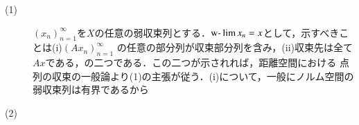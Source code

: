 	\begin{prf}
		\begin{description}
			\item[(1)] $(x_n)_{n=1}^{\infty}$を$X$の任意の弱収束列とする．$\mbox{w-}\lim x_n = x$として，示すべきことは(i)$(Ax_n)_{n=1}^{\infty}$
				の任意の部分列が収束部分列を含み，(ii)収束先は全て$Ax$である，の二つである．この二つが示されれば，距離空間における
				点列の収束の一般論より(1)の主張が従う．(i)について，一般にノルム空間の弱収束列は有界であるから
			\item[(2)]
		\end{description}
	\end{prf}
